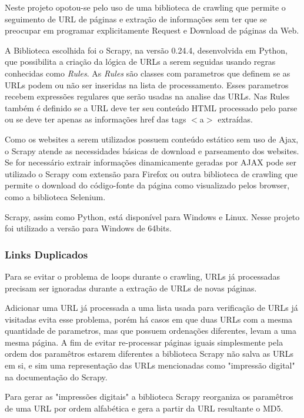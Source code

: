 \documentclass[12pt]{article}
\begin{document}
Neste projeto opotou-se pelo uso de uma biblioteca de crawling que permite o seguimento de URL de páginas e extração de informações sem ter que se preocupar em programar explicitamente Request e Download de páginas da Web.

A Biblioteca escolhida foi o Scrapy, na versão 0.24.4, desenvolvida em Python, que possibilita a criação da lógica de URLs a serem seguidas usando regras conhecidas como \textit{Rules}. As \textit{Rules} são classes com parametros que definem se as URLs podem ou não ser inseridas na lista de processamento. Esses parametros recebem expressões regulares que serão usadas na analise das URLs. Nas Rules também é definido se a URL deve ter seu conteúdo HTML processado pelo parse ou se deve ter apenas as informações href das tags $<$a$>$ extraídas.

Como os websites a serem utilizados possuem conteúdo estático sem uso de Ajax, o Scrapy atende as necessidades básicas de download e parseamento dos websites. Se for necessário extrair informações dinamicamente geradas por AJAX pode ser utilizado o Scrapy com extensão para Firefox ou outra biblioteca de crawling que permite o download do código-fonte da página como visualizado pelos browser, como a biblioteca Selenium.

Scrapy, assim como Python, está disponível para Windows e Linux. Nesse projeto foi utilizado a versão para Windows de 64bits.

\subsubsection{Links Duplicados}

Para se evitar o problema de loops durante o crawling, URLs já processadas precisam ser ignoradas durante a extração de URLs de novas páginas.

Adicionar uma URL já processada a uma lista usada para verificação de URLs já visitadas evita esse problema, porém há casos em que duas URLs com a mesma quantidade de parametros, mas que possuem ordenações diferentes, levam a uma mesma página. A fim de evitar re-processar páginas iguais simplesmente pela ordem dos paramêtros estarem diferentes a biblioteca Scrapy não salva as URLs em si, e sim uma representação das URLs mencionadas como "impressão digital" na documentação do Scrapy. 

Para gerar as "impressões digitais" a biblioteca Scrapy reorganiza os paramêtros de uma URL por ordem alfabética e gera a partir da URL resultante o MD5.
\end{document}
